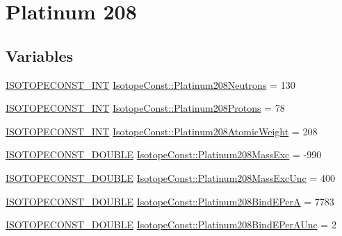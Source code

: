 \hypertarget{group___isotope_const-_platinum-_pt208}{}\section{Platinum 208}
\label{group___isotope_const-_platinum-_pt208}
\subsection*{Variables}
\begin{DoxyCompactItemize}
\item 
\mbox{\hyperlink{group___isotope_const-_macros_ga5f18360b3e99483a35c32d789e62621c}{I\+S\+O\+T\+O\+P\+E\+C\+O\+N\+S\+T\+\_\+\+I\+NT}} \mbox{\hyperlink{group___isotope_const-_platinum-_pt208_gada4146cdbbfd479622324c8d13c7e234}{Isotope\+Const\+::\+Platinum208\+Neutrons}} = 130
\item 
\mbox{\hyperlink{group___isotope_const-_macros_ga5f18360b3e99483a35c32d789e62621c}{I\+S\+O\+T\+O\+P\+E\+C\+O\+N\+S\+T\+\_\+\+I\+NT}} \mbox{\hyperlink{group___isotope_const-_platinum-_pt208_ga161d00f4721d2090ea5fb67cb6bfd931}{Isotope\+Const\+::\+Platinum208\+Protons}} = 78
\item 
\mbox{\hyperlink{group___isotope_const-_macros_ga5f18360b3e99483a35c32d789e62621c}{I\+S\+O\+T\+O\+P\+E\+C\+O\+N\+S\+T\+\_\+\+I\+NT}} \mbox{\hyperlink{group___isotope_const-_platinum-_pt208_gae0e925b185be51844a6e6a48a9c0cf46}{Isotope\+Const\+::\+Platinum208\+Atomic\+Weight}} = 208
\item 
\mbox{\hyperlink{group___isotope_const-_macros_ga8f45a7272ce02c0b4c65c44636ed719a}{I\+S\+O\+T\+O\+P\+E\+C\+O\+N\+S\+T\+\_\+\+D\+O\+U\+B\+LE}} \mbox{\hyperlink{group___isotope_const-_platinum-_pt208_ga33942a40953b560ef9b139cddb48e28a}{Isotope\+Const\+::\+Platinum208\+Mass\+Exc}} = -\/990
\item 
\mbox{\hyperlink{group___isotope_const-_macros_ga8f45a7272ce02c0b4c65c44636ed719a}{I\+S\+O\+T\+O\+P\+E\+C\+O\+N\+S\+T\+\_\+\+D\+O\+U\+B\+LE}} \mbox{\hyperlink{group___isotope_const-_platinum-_pt208_ga4334dce7ad5af752eaa61ecb27ac67c9}{Isotope\+Const\+::\+Platinum208\+Mass\+Exc\+Unc}} = 400
\item 
\mbox{\hyperlink{group___isotope_const-_macros_ga8f45a7272ce02c0b4c65c44636ed719a}{I\+S\+O\+T\+O\+P\+E\+C\+O\+N\+S\+T\+\_\+\+D\+O\+U\+B\+LE}} \mbox{\hyperlink{group___isotope_const-_platinum-_pt208_ga689ad10379214e71c1730d01ccfe1f23}{Isotope\+Const\+::\+Platinum208\+Bind\+E\+PerA}} = 7783
\item 
\mbox{\hyperlink{group___isotope_const-_macros_ga8f45a7272ce02c0b4c65c44636ed719a}{I\+S\+O\+T\+O\+P\+E\+C\+O\+N\+S\+T\+\_\+\+D\+O\+U\+B\+LE}} \mbox{\hyperlink{group___isotope_const-_platinum-_pt208_gaf79c2f943bb34488fd466907fba66437}{Isotope\+Const\+::\+Platinum208\+Bind\+E\+Per\+A\+Unc}} = 2

\end{DoxyCompactItemize}

